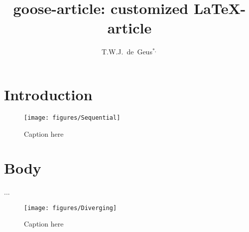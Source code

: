 \documentclass{goose-article}
\title{goose-article: customized \LaTeX-article}
\author[1]{T.W.J.~de~Geus$^{*,}$}
\affil[1]{
  Physics Institute, \'{E}cole Polytechnique F\'{e}d\'{e}rale de Lausanne (EPFL) \nl
  Switzerland
}
\begin{document}
\maketitle

\begin{abstract}
\noindent
\lipsum[1]

\end{abstract}

\section{Introduction}
\lipsum[2-4] \citep{Geus10,Geus11,Geus12}

\begin{figure}[htp]
  \centering
  \texttt{[image: figures/Sequential]}
  \caption{Caption here}
  \label{fig:a}
\end{figure}

\section{Body}
\lipsum[5-10] \citet{Geus13,Foo.Bar} ...

\begin{figure}[htp]
  \centering
  \texttt{[image: figures/Diverging]}
  \caption{Caption here}
  \label{fig:b}
\end{figure}


% 
\end{document}
